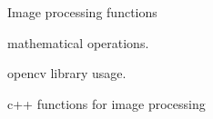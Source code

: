 Image processing functions
\begin{DoxyItemize}
\item mathematical operations.
\item opencv library usage.
\item c++ functions for image processing 
\end{DoxyItemize}